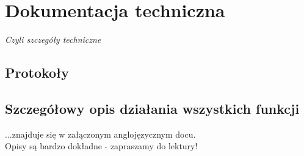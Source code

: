 \section{Dokumentacja techniczna}

\begin{center}
\textit{Czyli szczegóły techniczne}
\end{center}



\subsection{Protokoły}

\subsection{Szczegółowy opis działania wszystkich funkcji}
...znajduje się w załączonym anglojęzycznym docu.\\
Opisy są bardzo dokładne - zapraszamy do lektury!
